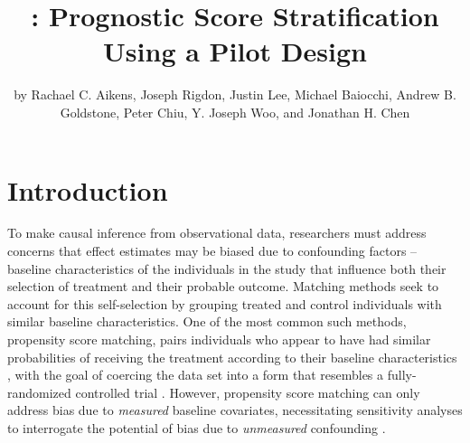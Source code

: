 \title{: Prognostic Score Stratification Using a Pilot Design}
\author{by Rachael C. Aikens, Joseph Rigdon, Justin Lee, Michael Baiocchi, Andrew B. Goldstone, Peter Chiu, Y. Joseph Woo, and Jonathan H. Chen}

\maketitle


\section{Introduction}\label{sec:intro}

To make causal inference from observational data, researchers must address concerns that effect estimates may be biased due to confounding factors -- baseline characteristics of the individuals in the study that influence both their selection of treatment and their probable outcome. Matching methods seek to account for this self-selection by grouping treated and control individuals with similar baseline characteristics. One of the most common such methods, propensity score matching, pairs individuals who appear to have had similar probabilities of receiving the treatment according to their baseline characteristics \citep{rosenbaum1983central}, with the goal of coercing the data set into a form that resembles a fully-randomized controlled trial \citep{king2019propensity, rosenbaum2010designbook, hernan2016using}. However, propensity score matching can only address bias due to \textit{measured} baseline covariates, necessitating sensitivity analyses to interrogate the potential of bias due to \textit{unmeasured} confounding \citep{rosenbaum2005sensitivity, rosenbaum2010designbook}.


